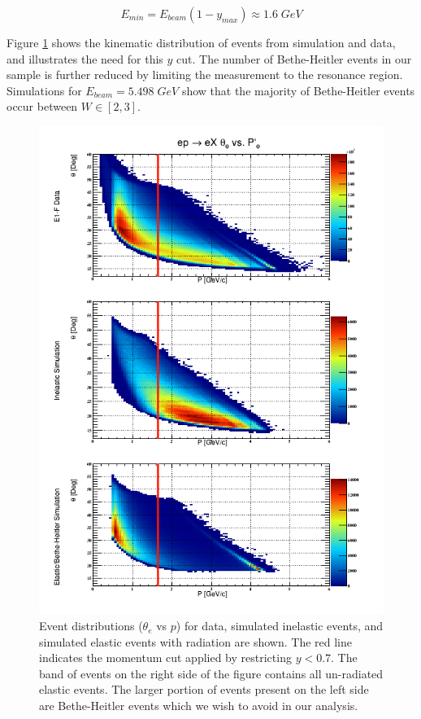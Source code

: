 \begin{equation}
	E_{min} = E_{beam}(1-y_{max}) \approx 1.6 \; GeV  
\end{equation}   

Figure \ref{fig-kinematics-compare} shows the kinematic distribution of events from simulation and data, and illustrates the need for this $y$ cut.  The number of Bethe-Heitler events in our sample is further reduced by limiting the measurement to the resonance region.  Simulations for $E_{beam} = 5.498 \; GeV$ show that the majority of Bethe-Heitler events occur between $W \in [2, 3]$.

\begin{figure}
	\centering
	\label{fig-kinematics-compare} 
	\includegraphics[width=\textwidth]{image/plots/inclusive/ycut.png}
	\caption{Event distributions ($\theta_e$ vs $p$) for data, simulated inelastic events, and simulated elastic events with radiation are shown.  The red line indicates the momentum cut applied by restricting $y < 0.7$.   The band of events on the right side of the figure contains all un-radiated elastic events.  The larger portion of events present on the left side are Bethe-Heitler events which we wish to avoid in our analysis.}
\end{figure}


